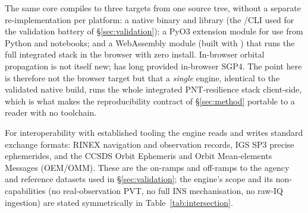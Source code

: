 The same core compiles to three targets from one source tree, without a separate
re-implementation per platform: a native binary and library (the /CLI used
for the validation battery of \S\ref{sec:validation}); a PyO3 extension module for use
from Python and notebooks; and a WebAssembly module (built with ) that
runs the full integrated stack in the browser with zero install. In-browser orbital
propagation is not itself new;  \citep{satellitejs} has long
provided in-browser SGP4. The point here is therefore not the browser target but that
a \emph{single} engine, identical to the validated native build, runs the whole
integrated PNT-resilience stack client-side, which is what makes the reproducibility
contract of \S\ref{sec:method} portable to a reader with no toolchain.

For interoperability with established tooling the engine reads and writes
standard exchange formats: RINEX navigation and observation records, IGS SP3 precise
ephemerides, and the CCSDS Orbit Ephemeris and Orbit Mean-elements Messages (OEM/OMM).
These are the on-ramps and off-ramps to the agency and reference datasets used in
\S\ref{sec:validation}; the engine's scope and its non-capabilities (no
real-observation PVT, no full INS mechanisation, no raw-IQ ingestion) are stated
symmetrically in Table~\ref{tab:intersection}.
